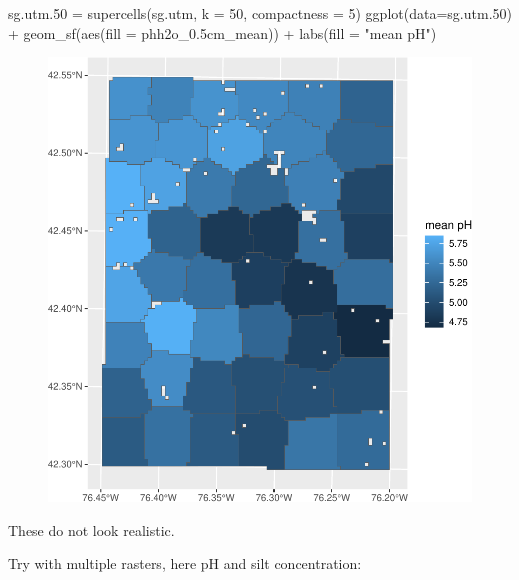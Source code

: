 \documentclass[
  letterpaper,
  DIV=11,
  numbers=noendperiod]{scrartcl}
\newenvironment{Shaded}{\begin{snugshade}}{\end{snugshade}}
\newcommand{\AttributeTok}[1]{\textcolor[rgb]{0.40,0.45,0.13}{#1}}
\newcommand{\DecValTok}[1]{\textcolor[rgb]{0.68,0.00,0.00}{#1}}
\newcommand{\FloatTok}[1]{\textcolor[rgb]{0.68,0.00,0.00}{#1}}
\newcommand{\FunctionTok}[1]{\textcolor[rgb]{0.28,0.35,0.67}{#1}}
\newcommand{\NormalTok}[1]{\textcolor[rgb]{0.00,0.23,0.31}{#1}}
\newcommand{\OtherTok}[1]{\textcolor[rgb]{0.00,0.23,0.31}{#1}}
\newcommand{\SpecialCharTok}[1]{\textcolor[rgb]{0.37,0.37,0.37}{#1}}
\newcommand{\StringTok}[1]{\textcolor[rgb]{0.13,0.47,0.30}{#1}}
\begin{document}
\begin{Shaded}
\begin{Highlighting}[]
\NormalTok{sg.utm}\FloatTok{.50} \OtherTok{=} \FunctionTok{supercells}\NormalTok{(sg.utm, }\AttributeTok{k =} \DecValTok{50}\NormalTok{, }\AttributeTok{compactness =} \DecValTok{5}\NormalTok{)}
\FunctionTok{ggplot}\NormalTok{(}\AttributeTok{data=}\NormalTok{sg.utm}\FloatTok{.50}\NormalTok{) }\SpecialCharTok{+}
  \FunctionTok{geom\_sf}\NormalTok{(}\FunctionTok{aes}\NormalTok{(}\AttributeTok{fill =}\NormalTok{ phh2o\_0}\FloatTok{.5}\NormalTok{cm\_mean)) }\SpecialCharTok{+}
  \FunctionTok{labs}\NormalTok{(}\AttributeTok{fill =} \StringTok{"mean pH"}\NormalTok{)}
\end{Highlighting}
\end{Shaded}

\begin{figure}[H]

{\centering \includegraphics{PatternAnalysisWorkshopTutorial_files/figure-pdf/supercells-compact-1.pdf}

}

\end{figure}

These do not look realistic.

Try with multiple rasters, here pH and silt concentration:
\end{document}

